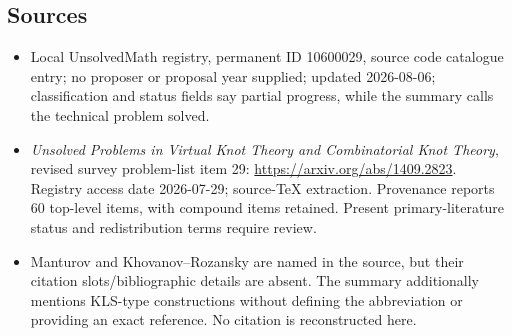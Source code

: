 \documentclass[11pt]{article}
\begin{document}
\subsection{Sources}
\begin{itemize}
\item Local UnsolvedMath registry, permanent ID 10600029, source code catalogue entry; no proposer or proposal year supplied; updated 2026-08-06; classification and status fields say partial progress, while the summary calls the technical problem solved.
\item \emph{Unsolved Problems in Virtual Knot Theory and Combinatorial Knot Theory}, revised survey problem-list item 29: \url{https://arxiv.org/abs/1409.2823}. Registry access date 2026-07-29; source-TeX extraction. Provenance reports 60 top-level items, with compound items retained. Present primary-literature status and redistribution terms require review.
\item Manturov and Khovanov--Rozansky are named in the source, but their citation slots/bibliographic details are absent. The summary additionally mentions KLS-type constructions without defining the abbreviation or providing an exact reference. No citation is reconstructed here.
\end{itemize}
\end{document}
